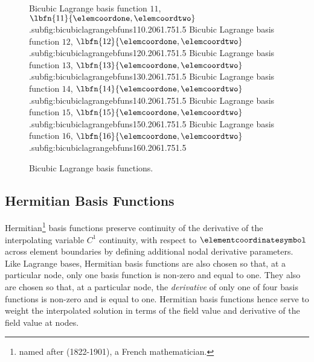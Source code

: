 \begin{figure}[hbtp]
   \hfil
     {Bicubic Lagrange basis function $11$, $\lbfn{11}{\elemcoordone,\elemcoordtwo}$.}{subfig:bicubiclagrangebfuns11}{0.20\linewidth}{6}{1.75}{1.5}
   \hfil
     {Bicubic Lagrange basis function $12$, $\lbfn{12}{\elemcoordone,\elemcoordtwo}$.}{subfig:bicubiclagrangebfuns12}{0.20\linewidth}{6}{1.75}{1.5}
     {Bicubic Lagrange basis function $13$, $\lbfn{13}{\elemcoordone,\elemcoordtwo}$.}{subfig:bicubiclagrangebfuns13}{0.20\linewidth}{6}{1.75}{1.5}
   \hfil
     {Bicubic Lagrange basis function $14$, $\lbfn{14}{\elemcoordone,\elemcoordtwo}$.}{subfig:bicubiclagrangebfuns14}{0.20\linewidth}{6}{1.75}{1.5}
   \hfil
     {Bicubic Lagrange basis function $15$, $\lbfn{15}{\elemcoordone,\elemcoordtwo}$.}{subfig:bicubiclagrangebfuns15}{0.20\linewidth}{6}{1.75}{1.5}
   \hfil
     {Bicubic Lagrange basis function $16$, $\lbfn{16}{\elemcoordone,\elemcoordtwo}$.}{subfig:bicubiclagrangebfuns16}{0.20\linewidth}{6}{1.75}{1.5}
   \caption[Bicubic Lagrange basis functions.]{Bicubic Lagrange basis functions.}
   \label{fig:bicubiclagrangebfuns}
\end{figure}

\subsection{Hermitian Basis Functions}
\label{sec:Hermitianbasisfunctions}

Hermitian\footnote{named after
(1822-1901), a French mathematician.} basis functions preserve
continuity of the derivative of the interpolating variable \ie $C^{1}$
continuity, with respect to $\elementcoordinatesymbol$ across element
boundaries by defining additional nodal derivative parameters. Like
Lagrange bases, Hermitian basis functions are also chosen so that, at
a particular node, only one basis function is non-zero and equal to
one. They also are chosen so that, at a particular node,
the \emph{derivative} of only one of four basis functions is non-zero
and is equal to one. Hermitian basis functions hence serve to weight
the interpolated solution in terms of the field value and derivative
of the field value at nodes.

